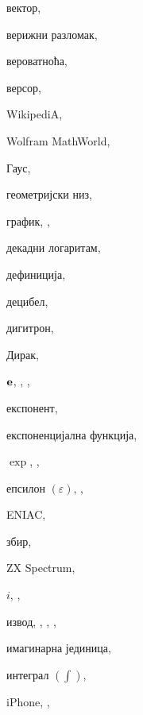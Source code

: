\begin{theindex}
  \indexspace

  \item вектор, 
  \item верижни разломак, 
  \item вероватноћа, 
  \item версор, 
  \interskip
  \item {\sc  WikipediA}, 
  \item Wolfram MathWorld, 

  \indexspace

  \item Гаус, 
  \item геометријски низ, 
  \item график, , 

  \indexspace

  \item декадни логаритам, 
  \item дефиниција, 
  \item децибел, 
  \item дигитрон, 
  \item Дирак, 

  \indexspace

  \item ${\bf e}$, , , 
  \item експонент, 
  \item експоненцијална функција, 
  \item $\exp$, , 
  \item епсилон $(\varepsilon)$, , 
  \interskip
  \item ENIAC, 

  \indexspace

  \item збир, 
  \interskip
  \item \textsf{ZX Spectrum}, 

  \indexspace

  \item $i$, , 
  \item извод, , , , 
  \item имагинарна јединица, 
  \item интеграл $(\int)$, 
  \interskip
  \item iPhone, , 


\end{theindex}
